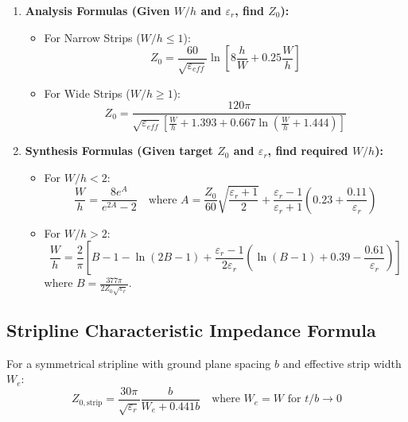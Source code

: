 \documentclass[10pt,a4paper]{article}
\begin{document}
\begin{enumerate}[leftmargin=*, itemsep=5pt]
  \item \textbf{Analysis Formulas (Given $W/h$ and $\varepsilon_r$, find $Z_0$):}
    \begin{itemize}[leftmargin=*, itemsep=3pt]
      \item For Narrow Strips ($W/h \le 1$):
        \begin{equation}
          Z_0 = \frac{60}{\sqrt{\varepsilon_{eff}}} \ln\left[ 8\frac{h}{W} + 0.25\frac{W}{h} \right]
        \end{equation}
      \item For Wide Strips ($W/h \ge 1$):
        \begin{equation}
          Z_0 = \frac{120\pi}{\sqrt{\varepsilon_{eff}} \left[ \frac{W}{h} + 1.393 + 0.667 \ln\left( \frac{W}{h} + 1.444 \right) \right]}
        \end{equation}
    \end{itemize}

  \item \textbf{Synthesis Formulas (Given target $Z_0$ and $\varepsilon_r$, find required $W/h$):}
    \begin{itemize}[leftmargin=*, itemsep=3pt]
      \item For $W/h < 2$:
        \begin{equation}
          \frac{W}{h} = \frac{8 e^A}{e^{2A} - 2} \quad \text{where } A = \frac{Z_0}{60} \sqrt{\frac{\varepsilon_r+1}{2}} + \frac{\varepsilon_r-1}{\varepsilon_r+1} \left( 0.23 + \frac{0.11}{\varepsilon_r} \right)
        \end{equation}
      \item For $W/h > 2$:
        \begin{equation}
          \frac{W}{h} = \frac{2}{\pi} \left[ B - 1 - \ln(2B-1) + \frac{\varepsilon_r-1}{2\varepsilon_r} \left( \ln(B-1) + 0.39 - \frac{0.61}{\varepsilon_r} \right) \right]
        \end{equation}
        where $B = \frac{377\pi}{2 Z_0 \sqrt{\varepsilon_r}}$.
    \end{itemize}
\end{enumerate}

\subsection{Stripline Characteristic Impedance Formula}
For a symmetrical stripline with ground plane spacing $b$ and effective strip width $W_e$:
\begin{equation}
  Z_{0,\text{strip}} = \frac{30\pi}{\sqrt{\varepsilon_r}} \frac{b}{W_e + 0.441b} \quad \text{where } W_e = W \text{ for } t/b \to 0
\end{equation}
\end{document}
